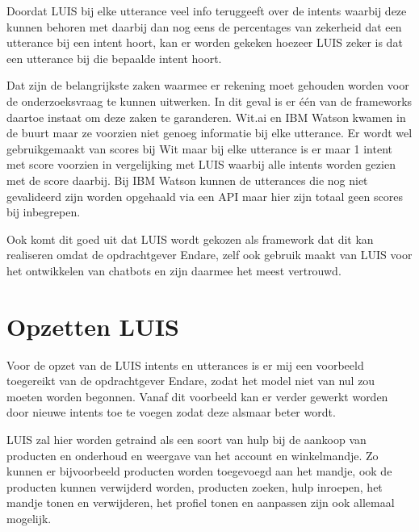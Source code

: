 Doordat LUIS bij elke utterance veel info teruggeeft over de intents waarbij deze kunnen behoren met daarbij dan nog eens de percentages van zekerheid dat een utterance bij een intent hoort, kan er worden gekeken hoezeer LUIS zeker is dat een utterance bij die bepaalde intent hoort.

Dat zijn de belangrijkste zaken waarmee er rekening moet gehouden worden voor de onderzoeksvraag te kunnen uitwerken. In dit geval is er één van de frameworks daartoe instaat om deze zaken te garanderen. Wit.ai en IBM Watson kwamen in de buurt maar ze voorzien niet genoeg informatie bij elke utterance. Er wordt wel gebruikgemaakt van scores bij Wit maar bij elke utterance is er maar 1 intent met score voorzien in vergelijking met LUIS waarbij alle intents worden gezien met de score daarbij. Bij IBM Watson kunnen de utterances die nog niet gevalideerd zijn worden opgehaald via een API maar hier zijn totaal geen scores bij inbegrepen.

Ook komt dit goed uit dat LUIS wordt gekozen als framework dat dit kan realiseren omdat de opdrachtgever Endare, zelf ook gebruik maakt van LUIS voor het ontwikkelen van chatbots en zijn daarmee het meest vertrouwd.

\section{Opzetten LUIS}
\label{sec:opzet}

Voor de opzet van de LUIS intents en utterances is er mij een voorbeeld toegereikt van de opdrachtgever Endare, zodat het model niet van nul zou moeten worden begonnen. Vanaf dit voorbeeld kan er verder gewerkt worden door nieuwe intents toe te voegen zodat deze alsmaar beter wordt.

LUIS zal hier worden getraind als een soort van hulp bij de aankoop van producten en onderhoud en weergave van het account en winkelmandje. Zo kunnen er bijvoorbeeld producten worden toegevoegd aan het mandje, ook de producten kunnen verwijderd worden, producten zoeken, hulp inroepen, het mandje tonen en verwijderen, het profiel tonen en aanpassen zijn ook allemaal mogelijk.

